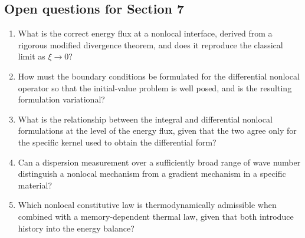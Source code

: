 \subsection{Open questions for Section 7}

\begin{enumerate}[label=\textbf{OQ7.\arabic*}]
\item What is the correct energy flux at a nonlocal interface, derived from a rigorous modified divergence theorem, and does it reproduce the classical limit as $\xi \to 0$? \label{oq:7.1}
\item How must the boundary conditions be formulated for the differential nonlocal operator so that the initial-value problem is well posed, and is the resulting formulation variational? \label{oq:7.2}
\item What is the relationship between the integral and differential nonlocal formulations at the level of the energy flux, given that the two agree only for the specific kernel used to obtain the differential form? \label{oq:7.3}
\item Can a dispersion measurement over a sufficiently broad range of wave number distinguish a nonlocal mechanism from a gradient mechanism in a specific material? \label{oq:7.4}
\item Which nonlocal constitutive law is thermodynamically admissible when combined with a memory-dependent thermal law, given that both introduce history into the energy balance? \label{oq:7.5}
\end{enumerate}

